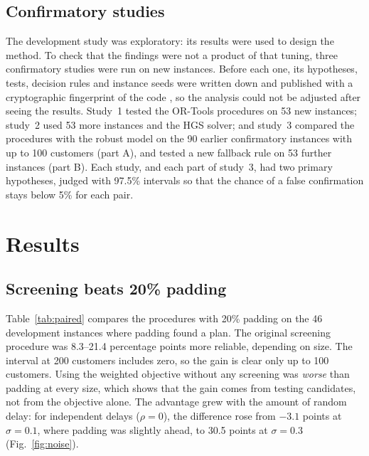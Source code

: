 \documentclass[12pt,letterpaper]{article}
\begin{document}
\subsection{Confirmatory studies}

The development study was exploratory: its results were used to design the
method. To check that the findings were not a product of that tuning, three
confirmatory studies were run on new instances. Before each one, its hypotheses,
tests, decision rules and instance seeds were written down and published with a
cryptographic fingerprint of the code \cite{ali2026freeze,ali2026freeze2,ali2026freeze3},
so the analysis could not be adjusted after seeing the results. Study~1 tested the
OR-Tools procedures on 53 new instances; study~2 used 53 more instances and the
HGS solver; and study~3 compared the procedures with the robust model on the 90
earlier confirmatory instances with up to 100 customers (part A), and tested a new
fallback rule on 53 further instances (part B). Each study, and each part of
study~3, had two primary hypotheses, judged with 97.5\% intervals so that the chance
of a false confirmation stays below 5\% for each pair.

\section{Results}

\subsection{Screening beats 20\% padding}

Table~\ref{tab:paired} compares the procedures with 20\% padding on the 46
development instances where padding found a plan. The original screening
procedure was 8.3--21.4 percentage points more reliable, depending on size.
The interval at 200 customers includes zero, so the gain is clear only up to 100
customers. Using the weighted objective without any screening was \emph{worse} than
padding at every size, which shows that the gain comes from testing candidates, not
from the objective alone. The advantage grew with the amount of random delay: for
independent delays ($\rho=0$), the difference rose from $-3.1$ points at
$\sigma=0.1$, where padding was slightly ahead, to 30.5 points at
$\sigma=0.3$ (Fig.~\ref{fig:noise}).
\end{document}
